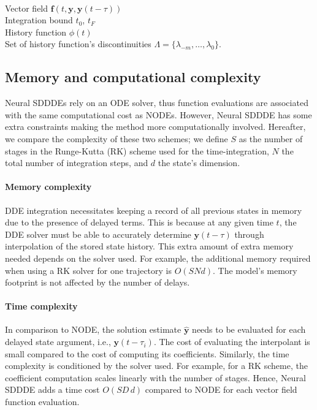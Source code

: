 \documentclass[pmlr]{jmlr}%
\begin{document}
\begin{algorithm}[H]
  \caption{Pseudo code for DDE solver}
  \label{alg:error_est}
\begin{algorithmic}[1]
   \\ Vector field $\mathbf{f}(t,\mathbf{y}, \mathbf{y}(t-\tau))$ \\ Integration bound $t_0$, $t_{F}$ \\ History function $\phi(t)$ \\ Set of history function's discontinuities $\Lambda = \{\lambda_{-m}, \dots, \lambda_0 \}$.
  \REPEAT
\end{algorithmic}
\label{al:agl2}
\end{algorithm}

\subsection{Memory and computational complexity} 

Neural SDDDEs rely on an ODE solver, thus function evaluations are associated with the same computational cost as NODEs. However, Neural SDDDE has some extra constraints making the method more computationally involved. Hereafter, we compare the complexity of these two schemes; we define $S$ as the number of stages in the Runge-Kutta (RK) scheme used for the time-integration, $N$ the total number of integration steps, and $d$ the state's dimension. 

\paragraph{Memory complexity} DDE integration necessitates keeping a record of all previous states in memory due to the presence of delayed terms. This is because at any given time $t$, the DDE solver must be able to accurately determine $\mathbf{y}(t-\tau)$ through interpolation of the stored state history. This extra amount of extra memory needed depends on the solver used. For example, the additional memory required when using a RK solver for one trajectory is $O(SNd)$. The model's memory footprint is not affected by the number of delays. 

\paragraph{Time complexity} In comparison to NODE, the solution estimate $\widehat{\mathbf{y}}$ needs to be evaluated for each delayed state argument, i.e., $\mathbf{y}(t-\tau_i)$. The cost of evaluating the interpolant is small compared to the cost of computing its coefficients. Similarly, the time complexity is conditioned by the solver used. For example, for a RK scheme, the coefficient computation scales linearly with the number of stages. Hence, Neural SDDDE adds a time cost $O(SD\,d)$ compared to NODE for each vector field function evaluation.
\end{document}
